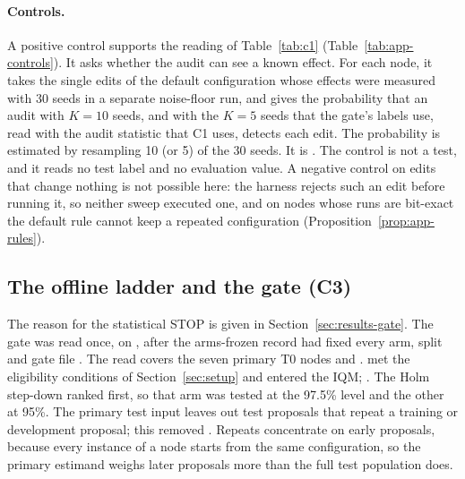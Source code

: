 \paragraph{Controls.}
A positive control supports the reading of Table~\ref{tab:c1} (Table~\ref{tab:app-controls}). It asks whether the audit can see a known effect. For each node, it takes the single edits of the default configuration whose effects were measured with 30 seeds in a separate noise-floor run, and gives the probability that an audit with $K=10$ seeds, and with the $K=5$ seeds that the gate's labels use, read with the audit statistic that C1 uses, detects each edit. The probability is estimated by resampling 10 (or 5) of the 30 seeds. It is \COnePositiveControl. The control is not a test, and it reads no test label and no evaluation value. A negative control on edits that change nothing is not possible here: the harness rejects such an edit before running it, so neither sweep executed one, and on nodes whose runs are bit-exact the default rule cannot keep a repeated configuration (Proposition~\ref{prop:app-rules}).

\subsection{The offline ladder and the gate (C3)}
\label{app:gate-full}

\ifGateStopped
The reason for the statistical STOP is given in Section~\ref{sec:results-gate}.
\else
The gate was read once, on \GateReadDate, after the arms-frozen record had fixed every arm, split and gate file . The read covers the seven primary T0 nodes and \TOneNodesUsed. \GateEligibleNodes{} met the eligibility conditions of Section~\ref{sec:setup} and entered the IQM; \GateExcludedNodes. The Holm step-down ranked \GateHolmFirst{} first, so that arm was tested at the 97.5\% level and the other at 95\%. The primary test input leaves out test proposals that repeat a training or development proposal; this removed \GateDupLeftOut. Repeats concentrate on early proposals, because every instance of a node starts from the same configuration, so the primary estimand weighs later proposals more than the full test population does. 

